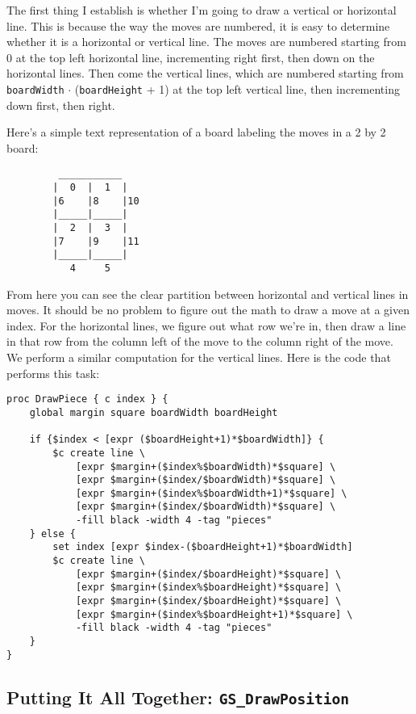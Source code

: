 \documentclass{article}
\begin{document}
The first thing I establish is whether I'm going to draw a vertical or horizontal line. This is because the way the moves are numbered, it is easy to determine whether it is a horizontal or vertical line. The moves are numbered starting from 0 at the top left horizontal line, incrementing right first, then down on the horizontal lines. Then come the vertical lines, which are numbered starting from \texttt{boardWidth} $\cdot$ (\texttt{boardHeight} + 1) at the top left vertical line, then incrementing down first, then right.

Here's a simple text representation of a board labeling the moves in a 2 by 2 board:
\begin{verbatim}
         ___________
        |  0  |  1  |
        |6    |8    |10
        |_____|_____|
        |  2  |  3  |
        |7    |9    |11
        |_____|_____|
           4     5
\end{verbatim}

From here you can see the clear partition between horizontal and vertical lines in moves. It should be no problem to figure out the math to draw a move at a given index. For the horizontal lines, we figure out what row we're in, then draw a line in that row from the column left of the move to the column right of the move. We perform a similar computation for the vertical lines. Here is the code that performs this task:

\begin{verbatim}
proc DrawPiece { c index } {
    global margin square boardWidth boardHeight

    if {$index < [expr ($boardHeight+1)*$boardWidth]} {
        $c create line \
            [expr $margin+($index%$boardWidth)*$square] \
            [expr $margin+($index/$boardWidth)*$square] \
            [expr $margin+($index%$boardWidth+1)*$square] \
            [expr $margin+($index/$boardWidth)*$square] \
            -fill black -width 4 -tag "pieces"
    } else {
        set index [expr $index-($boardHeight+1)*$boardWidth]
        $c create line \
            [expr $margin+($index/$boardHeight)*$square] \
            [expr $margin+($index%$boardHeight)*$square] \
            [expr $margin+($index/$boardHeight)*$square] \
            [expr $margin+($index%$boardHeight+1)*$square] \
            -fill black -width 4 -tag "pieces"
    }
}
\end{verbatim}

\subsection{Putting It All Together: \texttt{GS\_DrawPosition}}
\end{document}
